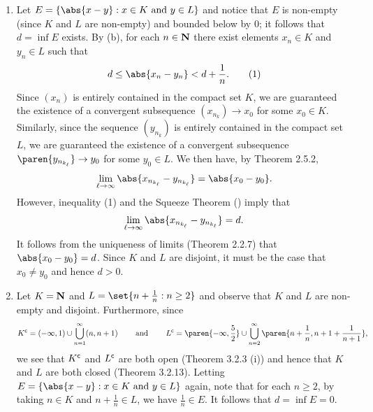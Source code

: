 \documentclass{lew98_solutions}
\begin{document}
\begin{solution}
    \begin{enumerate}
        \item Let \( E = \{ \abs{x - y} : x \in K \text{ and } y \in L \} \) and notice that \( E \) is non-empty (since \( K \) and \( L \) are non-empty) and bounded below by 0; it follows that \( d = \inf E \) exists. By  (b), for each \( n \in \mathbf{N} \) there exist elements \( x_n \in K \) and \( y_n \in L \) such that
        \[
            d \leq \abs{x_n - y_n} < d + \frac{1}{n}. \tag{1}
        \]
        Since \( (x_n) \) is entirely contained in the compact set \( K \), we are guaranteed the existence of a convergent subsequence \( (x_{n_k}) \to x_0 \) for some \( x_0 \in K \). Similarly, since the sequence \( (y_{n_k}) \) is entirely contained in the compact set \( L \), we are guaranteed the existence of a convergent subsequence \( \paren{ y_{n_{k_{\ell}}} } \to y_0 \) for some \( y_0 \in L \). We then have, by Theorem 2.5.2,
        \[
            \lim_{\ell \to \infty} \abs{x_{n_{k_{\ell}}} - y_{n_{k_{\ell}}}} = \abs{x_0 - y_0}.
        \]
        However, inequality (1) and the Squeeze Theorem () imply that
        \[
            \lim_{\ell \to \infty} \abs{x_{n_{k_{\ell}}} - y_{n_{k_{\ell}}}} = d.    
        \]
        It follows from the uniqueness of limits (Theorem 2.2.7) that \( \abs{x_0 - y_0} = d \). Since \( K \) and \( L \) are disjoint, it must be the case that \( x_0 \neq y_0 \) and hence \( d > 0 \).

        \item Let \( K = \mathbf{N} \) and \( L = \set{ n + \tfrac{1}{n} : n \geq 2 } \) and observe that \( K \) and \( L \) are non-empty and disjoint. Furthermore, since
        \[
            \setcomp{K} = (-\infty, 1) \cup \bigcup_{n=1}^{\infty} (n, n + 1) \hspaceand \setcomp{L} = \paren{ -\infty, \frac{5}{2} } \cup \bigcup_{n=2}^{\infty} \paren{ n + \frac{1}{n}, n + 1 + \frac{1}{n + 1} },
        \]
        we see that \( K^{\mathsf{c}} \) and \( L^{\mathsf{c}} \) are both open (Theorem 3.2.3 (i)) and hence that \( K \) and \( L \) are both closed (Theorem 3.2.13). Letting \( E = \{ \abs{x - y} : x \in K \text{ and } y \in L \} \) again, note that for each \( n \geq 2 \), by taking \( n \in K \) and \( n + \tfrac{1}{n} \in L \), we have \( \tfrac{1}{n} \in E \). It follows that \( d = \inf E = 0 \).
    \end{enumerate}
\end{solution}
\end{document}
